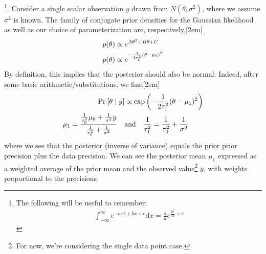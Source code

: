\documentclass[11pt]{article}
\begin{document}
\myspace
\p {}\footnote{The following will be useful to remember:
	\begin{align}
		\int_{-\infty}^{\infty} e^{-a x^2 + b x + c} \mathrm{d} x = \frac{\pi}{a} e^{\frac{b^2}{4a} + c}
	\end{align}
}. Consider a single scalar observation $y$ drawn from $N(\theta, \sigma^2)$, where we assume $\sigma^2$ is known. The family of conjugate prior densities for the Gaussian likelihood as well as our choice of parameterization are, respectively,[2em]
\begin{align}
	p(\theta) &\propto e^{A\theta^2 + B\theta + C} \\
	p(\theta) &\propto e^{-\frac{1}{2\tau_0^2}(\theta - \mu_0)^2  }
\end{align}
By definition, this implies that the posterior should also be normal. Indeed, after some basic arithmetic/substitutions, we find[2em]
\begin{align}
	\text{Pr}_{}\left[\theta \mid y\right] &\propto \exp\left(
		- \frac{1}{2 \tau_1^2} (\theta - \mu_1)^2
	\right) \\
	\mu_1 = \frac{ \frac{1}{\tau_0^2}\mu_0 + \frac{1}{\sigma^2} y }{ \frac{1}{\tau_0^2} + \frac{1}{\sigma^2}    } 
	\quad &\text{and} \quad
	\frac{1}{\tau_1^2} = \frac{1}{\tau_0^2} + \frac{1}{\sigma^2} 
\end{align}
where we see that the posterior  (inverse of variance) equals the prior prior precision plus the data precision. We can see the posterior mean $\mu_1$ expressed as a weighted average of the prior mean and the observed value\footnote{For now, we're considering the single data point case.} $y$, with weights proportional to the precisions.
\end{document}
